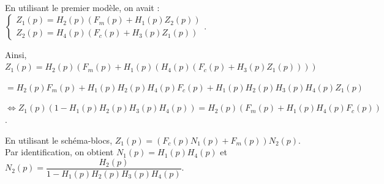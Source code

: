\ifprof
\begin{corrige}
En utilisant le premier modèle, on avait :
$
\left\{\begin{array}{l}
Z_1(p)=H_2(p)\left(F_m(p)+H_1(p)Z_2(p)\right) \\
Z_2(p)=H_4(p)\left(F_c(p)+H_3(p)Z_1(p)\right)
\end{array}
\right.
$. 

Ainsi, $Z_1(p)=H_2(p)\left(F_m(p)+H_1(p)\left( H_4(p)\left(F_c(p)+H_3(p)Z_1(p)\right)\right)\right) $

$=H_2(p)F_m(p)+H_1(p)H_2(p) H_4(p)F_c(p)+H_1(p)H_2(p) H_3(p)H_4(p)Z_1(p) $

$\Leftrightarrow Z_1(p)\left( 1-H_1(p)H_2(p) H_3(p)H_4(p)\right)=H_2(p)\left(F_m(p)+H_1(p)H_4(p)F_c(p)\right) $. 

En utilisant le schéma-blocs, $Z_1(p)=\left(F_c(p)N_1(p)+F_m(p)\right)N_2(p)$. 
Par identification, on obtient $N_1(p)=H_1(p)H_4(p)$ et $N_2(p)=\dfrac{H_2(p)}{1-H_1(p)H_2(p) H_3(p)H_4(p)}$.

\end{corrige}
\else
\fi

